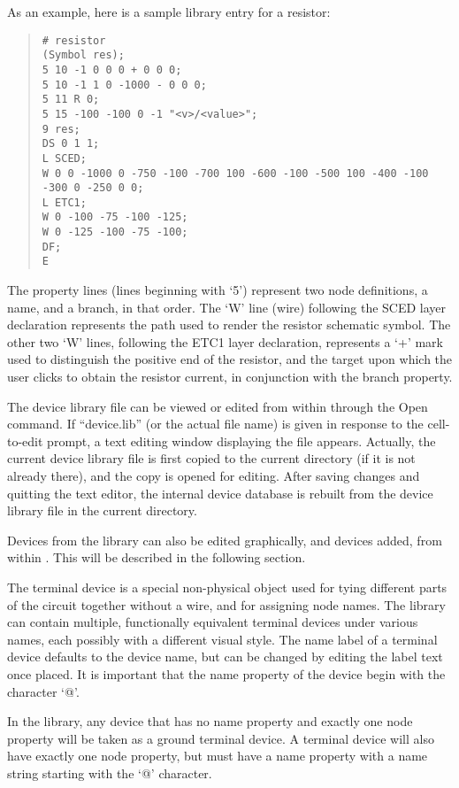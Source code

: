 As an example, here is a sample library entry for a resistor:

\begin{quote}
\begin{verbatim}
# resistor
(Symbol res);
5 10 -1 0 0 0 + 0 0 0;
5 10 -1 1 0 -1000 - 0 0 0;
5 11 R 0;
5 15 -100 -100 0 -1 "<v>/<value>";
9 res;
DS 0 1 1;
L SCED;
W 0 0 -1000 0 -750 -100 -700 100 -600 -100 -500 100 -400 -100 -300 0 -250 0 0;
L ETC1;
W 0 -100 -75 -100 -125;
W 0 -125 -100 -75 -100;
DF;
E
\end{verbatim}
\end{quote}

The property lines (lines beginning with `5') represent two node
definitions, a name, and a branch, in that order.
The `W' line (wire) following the SCED layer declaration represents
the path used to render the resistor schematic symbol.  The other two
`W' lines, following the ETC1 layer declaration, represents a `+' mark
used to distinguish the positive end of the resistor, and the target
upon which the user clicks to obtain the resistor current, in conjunction
with the {\et branch} property.

The device library file can be viewed or edited from within {\Xic}
through the {\cb Open} command.  If ``device.lib'' (or the actual file
name) is given in response to the cell-to-edit prompt, a text editing
window displaying the file appears.  Actually, the current device
library file is first copied to the current directory (if it is not
already there), and the copy is opened for editing.  After saving
changes and quitting the text editor, the internal device database is
rebuilt from the device library file in the current directory.

Devices from the library can also be edited graphically, and devices
added, from within {\Xic}.  This will be described in the following
section.

The terminal device is a special non-physical object used for tying
different parts of the circuit together without a wire, and for
assigning node names.  The library can contain multiple, functionally
equivalent terminal devices under various names, each possibly with a
different visual style.  The name label of a terminal device defaults
to the device name, but can be changed by editing the label text once
placed.  It is important that the {\et name} property of the device
begin with the character `{\vt @}'.

In the library, any device that has no {\et name} property and exactly
one {\et node} property will be taken as a ground terminal device.  A
terminal device will also have exactly one {\et node} property, but
must have a {\et name} property with a name string starting with the
`{\vt @}' character.

